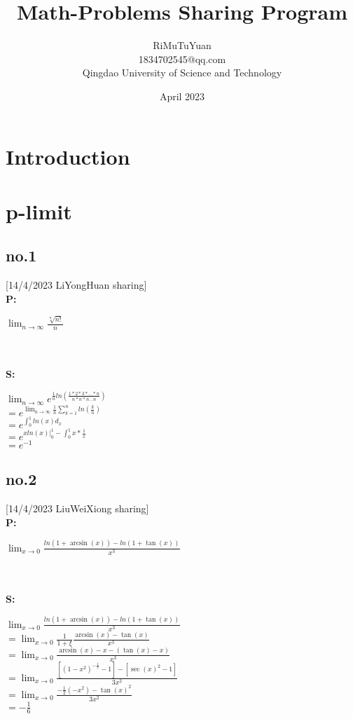 \documentclass{article}
\title{Math-Problems Sharing Program}
\author{RiMuTuYuan \\
    1834702545@qq.com\\
Qingdao University of Science and Technology}
\date{April 2023}
\begin{document}
\maketitle
\newpage

\tableofcontents
\section{Introduction}

\section{p-limit}
    \newpage
    \subsection{no.1}
    [14/4/2023 LiYongHuan sharing]\\
        \textbf{P:}\\
        \begin{large}
        $\lim_{n\to \infty}\frac{\sqrt[n]{n!}}{n}$
        \end{large}\\ \\
        \textbf{S:}\\
        \begin{large}
        $\lim_{n\to \infty}e^{\frac{1}{n}ln(\frac{1*2*3*...*n}{n*n*n...n})}$\\
        $=e^{\lim_{n\to \infty}\frac{1}{n}\sum_{k=1}^{n}ln(\frac{k}{n})}$\\
        $=e^{\int_{0}^{1}ln(x)d_{x}}$\\
        $=e^{xln(x)|_{0}^{1}-\int_{0}^{1}x*\frac{1}{x}}$\\
        $=e^{-1}$
        \end{large}

        \subsection{no.2}
         [14/4/2023 LiuWeiXiong sharing]\\
        \textbf{P:}\\
        \begin{large}
        $\lim_{x\to 0}\frac{ln(1+\arcsin(x))-ln(1+\tan(x))}{x^{3}}$
        \end{large}\\ \\
        \textbf{S:}\\
        \begin{large}
        $\lim_{x\to 0}\frac{ln(1+\arcsin(x))-ln(1+\tan(x))}{x^{3}}$\\
        $=\lim_{x\to 0}\frac{1}{1+\xi}\frac{\arcsin(x)-\tan(x)}{x^{3}}$\\
        $=\lim_{x \to 0}\frac{\arcsin(x)-x-(\tan(x)-x)}{x^{3}}$\\
        $=\lim_{x \to 0}\frac{[(1-x^{2})^{-\frac{1}{2}}-1]-[\sec(x)^{2}-1]}{3x^{2}}$\\
        $=\lim_{x\to 0}\frac{-\frac{1}{2}(-x^{2})-\tan(x)^{2}}{3x^{2}}$\\
        $=-\frac{1}{6}$
        \end{large}
\end{document}
